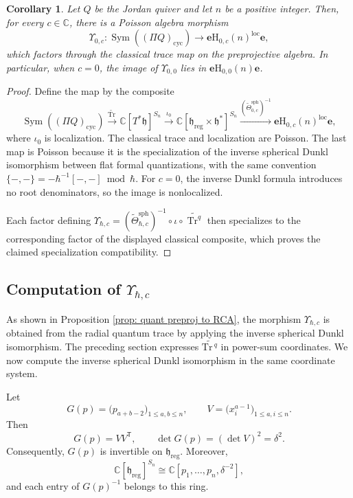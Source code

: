 \documentclass[11pt,reqno]{amsart}
\newtheorem{corollary}[theorem]{Corollary}
\theoremstyle{definition}
\newcommand{\bbC}{\mathbb{C}}
\newcommand{\be}{\mathbf{e}}
\newcommand{\Tr}{\mathrm{Tr} \,}
\newcommand{\rmH}{\mathrm{H}}
\newcommand{\cyc}{\mathrm{cyc}}
\newcommand{\Sym}{\operatorname{Sym}}
\newcommand{\fkh}{\mathfrak{h}}
\newcommand{\reg}{\mathrm{reg}}
\newcommand{\sph}{{\mathrm{sph}}}
\newcommand{\loc}{{\mathrm{loc}}}
\begin{document}
\begin{corollary}\label{cor: preproj vs rca}
	Let \(Q\) be the Jordan quiver and let \(n\) be a positive integer. Then, for every \(c\in\bbC\), there is a Poisson algebra morphism
	\[
	\Upsilon_{0,c}:
	\Sym((\Pi Q)_\cyc)
	\longrightarrow
	\be\rmH_{0,c}(n)^\loc\be,
	\]
	which factors through the classical trace map on the preprojective algebra.
	In particular, when \(c=0\), the image of \(\Upsilon_{0,0}\) lies in {\(\be\rmH_{0,0}(n)\be\)}.
\end{corollary}
\begin{proof}
Define the map by the composite
\[
\Sym((\Pi Q)_\cyc)
\xrightarrow{\widetilde{\Tr}}
\bbC[T^*\fkh]^{S_n}
\xrightarrow{\iota_0}
\bbC[\fkh_{\reg}\times\fkh^*]^{S_n}
\xrightarrow{(\widetilde\Theta_{0,c}^{\sph})^{-1}}
\be\rmH_{0,c}(n)^\loc\be,
\]
where \(\iota_0\) is localization. The classical trace and localization
are Poisson. The last map is Poisson because it is the specialization
of the inverse spherical Dunkl isomorphism between flat formal
quantizations, with the same convention
\(\{-,-\}=-\hbar^{-1}[-,-]\bmod\hbar\). For \(c=0\), the inverse
Dunkl formula introduces no root denominators, so the image is
nonlocalized.


Each factor defining
\(\Upsilon_{\hbar,c}
=
(\widetilde\Theta_{\hbar,c}^{\mathrm{sph}})^{-1}
\circ\iota
\circ\widetilde{\operatorname{Tr}^{q}}\)
then specializes to the
corresponding factor of the displayed classical composite,
which proves the claimed specialization compatibility.
\end{proof}





\subsection{Computation of
\texorpdfstring{\(\Upsilon_{\hbar,c}\)}{the Cherednik morphism}}
\label{subsec:inverse-spherical-dunkl-power-sum}

As shown in Proposition \ref{prop: quant preproj to RCA}, the morphism \(\Upsilon_{\hbar,c}\) is obtained from the radial quantum trace by applying the inverse spherical Dunkl isomorphism.
The preceding section expresses \(\widetilde{\Tr^q}\) in power-sum coordinates. We now compute the inverse spherical Dunkl isomorphism in the same coordinate system.

Let
\[
G(p)=\bigl(p_{a+b-2}\bigr)_{1\leq a,b\leq n},
\qquad
V=\bigl(x_i^{a-1}\bigr)_{1\leq a,i\leq n}.
\]
Then
\[
G(p)=VV^{\mathsf T},
\qquad
\det G(p)=(\det V)^2=\delta^2.
\]
Consequently, \(G(p)\) is invertible on \(\fkh_{\reg}\). 
Moreover,
\[
	\bbC[\fkh_{\reg}]^{S_n}
	\cong
	\bbC[p_1,\ldots,p_n,\delta^{-2}],
\]
and each entry of \(G(p)^{-1}\) belongs to this ring.
\end{document}
